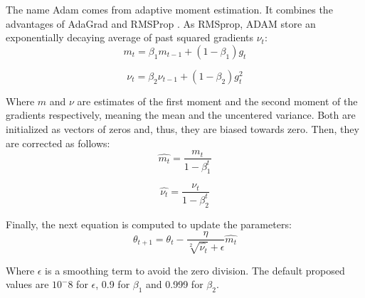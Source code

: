 
  
The name Adam comes from adaptive moment estimation. It combines the advantages of AdaGrad and RMSProp \cite{kingma2014adam}. As RMSprop, ADAM  store an exponentially decaying average of past squared gradients $\nu_t$: %
\begin{equation}
m_t=\beta_1 m_{t-1} + (1-\beta_1)g_t
\end{equation}

\begin{equation}
\nu_t=\beta_2 \nu_{t-1} + (1-\beta_2)g^2_t
\end{equation}

Where $m$ and $\nu$ are estimates of the first moment and the second moment of the gradients respectively, meaning the mean and the uncentered variance. Both are initialized as vectors of zeros and, thus, they are biased towards zero. Then, they are corrected as follows:
\begin{equation}
\hat{m_t}=\frac{m_t}{1-\beta^t_1}
\end{equation}

\begin{equation}
\hat{\nu_t}=\frac{\nu_t}{1-\beta^t_2}
\end{equation}

Finally, the next equation is computed to update the parameters:
\begin{equation}
\theta_{t+1}=\theta_t-\frac{\eta}{\sqrt[2]{\hat{\nu_t}} + \epsilon} \hat{m_t} 
\end{equation}

Where $\epsilon$ is a smoothing term to avoid the zero division. The default proposed values are $10^-8$ for $\epsilon$, 0.9 for $\beta_1$ and 0.999 for $\beta_2$.

